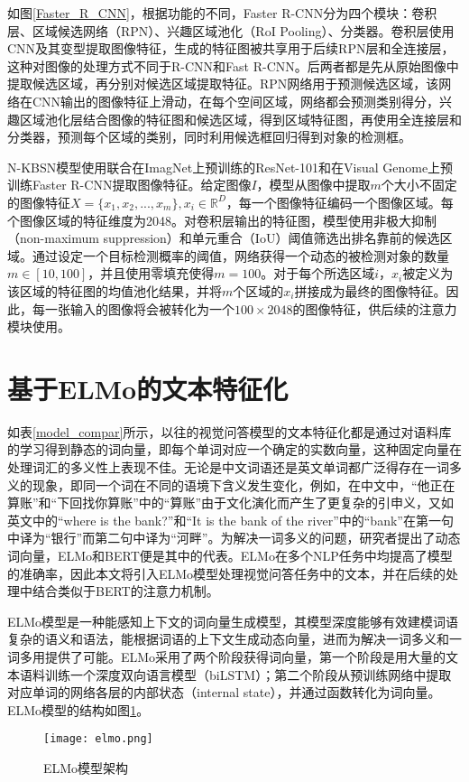 如图\ref{Faster_R_CNN}，根据功能的不同，Faster R-CNN分为四个模块：卷积层、区域候选网络（RPN）、兴趣区域池化（RoI Pooling）、分类器。卷积层使用CNN及其变型提取图像特征，生成的特征图被共享用于后续RPN层和全连接层，这种对图像的处理方式不同于R-CNN和Fast R-CNN。后两者都是先从原始图像中提取候选区域，再分别对候选区域提取特征。RPN网络用于预测候选区域，该网络在CNN输出的图像特征上滑动，在每个空间区域，网络都会预测类别得分，兴趣区域池化层结合图像的特征图和候选区域，得到区域特征图，再使用全连接层和分类器，预测每个区域的类别，同时利用候选框回归得到对象的检测框。

N-KBSN模型使用联合在ImagNet上预训练的ResNet-101和在Visual Genome上预训练Faster R-CNN提取图像特征。给定图像$I$，模型从图像中提取$m$个大小不固定的图像特征$X=\{x_1, x_2, ..., x_m\}, x_i \in \mathbb{R}^D$，每一个图像特征编码一个图像区域。每个图像区域的特征维度为2048。对卷积层输出的特征图，模型使用非极大抑制（non-maximum suppression）和单元重合（IoU）阈值筛选出排名靠前的候选区域。通过设定一个目标检测概率的阈值，网络获得一个动态的被检测对象的数量$m \in [10,100]$，并且使用零填充使得$m=100$。对于每个所选区域$i$，$x_i$被定义为该区域的特征图的均值池化结果，并将$m$个区域的$x_i$拼接成为最终的图像特征。因此，每一张输入的图像将会被转化为一个$100\times 2048$的图像特征，供后续的注意力模块使用。

\section{基于ELMo的文本特征化}

如表\ref{model_compar}所示，以往的视觉问答模型的文本特征化都是通过对语料库的学习得到静态的词向量，即每个单词对应一个确定的实数向量，这种固定向量在处理词汇的多义性上表现不佳。无论是中文词语还是英文单词都广泛得存在一词多义的现象，即同一个词在不同的语境下含义发生变化，例如，在中文中，“他正在算账”和“下回找你算账”中的“算账”由于文化演化而产生了更复杂的引申义，又如英文中的“where is the bank?”和“It is the bank of the river”中的“bank”在第一句中译为“银行”而第二句中译为“河畔”。为解决一词多义的问题，研究者提出了动态词向量，ELMo和BERT便是其中的代表。ELMo在多个NLP任务中均提高了模型的准确率，因此本文将引入ELMo模型处理视觉问答任务中的文本，并在后续的处理中结合类似于BERT的注意力机制。

ELMo模型是一种能感知上下文的词向量生成模型，其模型深度能够有效建模词语复杂的语义和语法，能根据词语的上下文生成动态向量，进而为解决一词多义和一词多用提供了可能。ELMo采用了两个阶段获得词向量，第一个阶段是用大量的文本语料训练一个深度双向语言模型（biLSTM）；第二个阶段从预训练网络中提取对应单词的网络各层的内部状态（internal state），并通过函数转化为词向量。ELMo模型的结构如图\ref{elmo}。
\begin{figure}[H]
	\texttt{[image: elmo.png]}
	\caption{ELMo模型架构}
	\label{elmo}
\end{figure}

